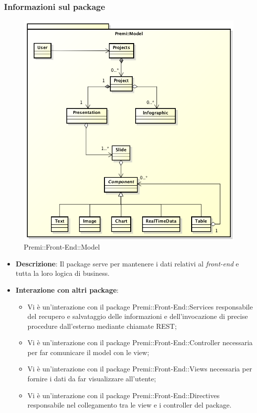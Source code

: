 \subsubsection*{Informazioni sul package}
\begin{figure}[h]
	\centering
	\includegraphics[width=0.9\linewidth]{img/front-end_model}
	\caption[Premi::Front-End::Model]{Premi::Front-End::Model}
\end{figure}
\begin{itemize}
	\item \textbf{Descrizione}: Il package serve per mantenere i dati relativi al \textit{\gls{front-end}} e tutta la loro logica di \gls{business}.
	\item \textbf{Interazione con altri package}:
	\begin{itemize}
		\item Vi è un'interazione con il package Premi::Front-End::Services responsabile del recupero e salvataggio delle informazioni e dell'invocazione di precise procedure dall'esterno mediante chiamate REST;
		\item Vi è un'interazione con il package Premi::Front-End::Controller necessaria per far comunicare il model con le view;
		\item Vi è un'interazione con il package Premi::Front-End::Views necessaria per fornire i dati da far visualizzare all'utente;
		\item Vi è un'interazione con il package Premi::Front-End::Directives responsabile nel collegamento tra le view e i controller del package.
	\end{itemize}
\end{itemize}

